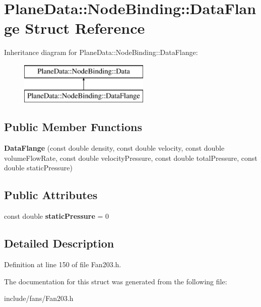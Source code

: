 \hypertarget{struct_plane_data_1_1_node_binding_1_1_data_flange}{}\section{Plane\+Data\+:\+:Node\+Binding\+:\+:Data\+Flange Struct Reference}
\label{struct_plane_data_1_1_node_binding_1_1_data_flange}
Inheritance diagram for Plane\+Data\+:\+:Node\+Binding\+:\+:Data\+Flange\+:\begin{figure}[H]
\begin{center}
\leavevmode
\includegraphics[height=2.000000cm]{d5/d92/struct_plane_data_1_1_node_binding_1_1_data_flange}
\end{center}
\end{figure}
\subsection*{Public Member Functions}
\begin{DoxyCompactItemize}
\item 
\mbox{\label{struct_plane_data_1_1_node_binding_1_1_data_flange_ab70d450f11914a68f121f32b58b11f29}} 
{\bfseries Data\+Flange} (const double density, const double velocity, const double volume\+Flow\+Rate, const double velocity\+Pressure, const double total\+Pressure, const double static\+Pressure)
\end{DoxyCompactItemize}
\subsection*{Public Attributes}
\begin{DoxyCompactItemize}
\item 
\mbox{\label{struct_plane_data_1_1_node_binding_1_1_data_flange_a84b898bd8e199e2681324381aeb158d6}} 
const double {\bfseries static\+Pressure} = 0
\end{DoxyCompactItemize}


\subsection{Detailed Description}


Definition at line 150 of file Fan203.\+h.



The documentation for this struct was generated from the following file\+:\begin{DoxyCompactItemize}
\item 
include/fans/Fan203.\+h\end{DoxyCompactItemize}
